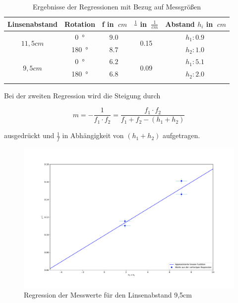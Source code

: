 \begin{table}[h!]
    \begin{center}
        \caption{Ergebnisse der Regressionen mit Bezug auf Messgrößen}
        \begin{tabular}{ccccc}
            \hline
            Linsenabstand           & Rotation          & f in $\SI{}{cm}$  & $\frac{1}{}$ in $\SI{}{\frac{1}{cm}}$ & Abstand $h_i$ in $\SI{}{cm}$\\
            \hline
            
            \multirow{2}{*}{$11,5cm$}   & \SI{0}{\degree}   & $\SI{9,0}{}$      & \multirow{2}{*}{\SI{0,15}{}}  & $h_1: \SI{0,9}{}$ \\
                                        & \SI{180}{\degree} & $\SI{8,7}{}$      &                               & $h_2: \SI{1,0}{}$ \\
            \hline
            \multirow{2}{*}{$9,5cm$}    & \SI{0}{\degree}   & $\SI{6,2}{}$      & \multirow{2}{*}{\SI{0,09}{}}  & $h_1: \SI{5,1}{}$ \\
                                        & \SI{180}{\degree} & $\SI{6,8}{}$      &                               & $h_2: \SI{2,0}{}$ \\
            \hline
            \label{tab:abbe-Regression-Werte}
        \end{tabular}
    \end{center}
\end{table}

\clearpage

Bei der zweiten Regression wird die Steigung durch

\begin{equation}
    m = - \frac{1}{f_1 \cdot f_2} = \frac{f_1 \cdot f_2}{f_1 + f_2 - (h_1 + h_2)}
\end{equation}

ausgedrückt und $\frac{1}{f}$ in Abhängigkeit von $(h_1 + h_2)$ aufgetragen.

\begin{figure}[h!]{}
    \begin{center}
        \includegraphics[scale=0.4]{./fig/Abbe_h1h2_Plot.pdf}
        \caption{Regression der Messwerte für den Linsenabstand 9,5cm}
        \label{fig:Abbe-Regress-h1h2}
    \end{center}
\end{figure}

